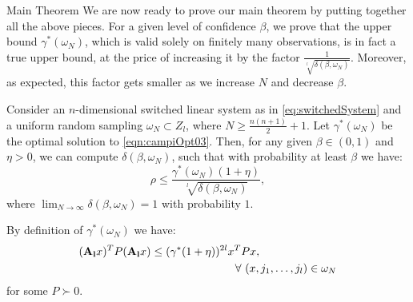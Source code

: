 \begin{subsection}{Main Theorem}
We are now ready to prove our main theorem by putting together all the above pieces. For a given level of confidence $\beta$, we prove that the upper bound $\gamma^{*}(\omega_N)$, which is valid solely on finitely many observations, is in fact a true upper bound, at the price of increasing it by the factor $\frac{1}{\sqrt[l]{\delta(\beta, \omega_N)}}$. Moreover, as expected, this factor gets smaller as we increase $N$ and decrease $\beta$.


\begin{thm}\label{thm:mainTheorem}
Consider an $n$-dimensional switched linear system as in \eqref{eq:switchedSystem} and a uniform random sampling $\omega_N \subset Z_l$, where $N \geq \frac{n(n+1)}{2}+1$. Let $\gamma^{*}(\omega_N) $ be the optimal solution to \eqref{eqn:campiOpt03}. Then, for any given $\beta \in (0,1)$ and $\eta > 0$, we can compute $\delta(\beta, \omega_N)$, such that with probability at least $\beta$ we have:
$$\rho \leq \frac{\gamma^{*}(\omega_N) (1+ \eta)}{\sqrt[l]{\delta(\beta, \omega_N)}},$$
where $\lim_{N \to \infty}\delta(\beta, \omega_N) = 1$ with probability $1$.
\end{thm}


\begin{pf}

By definition of $\gamma^{*}(\omega_N)$ we have:
\begin{equation*}
\begin{aligned} 
&(\mathbf{A_l} x)^T P (\mathbf{A_l} x) \leq (\gamma^{*}(1+\eta))^{2l} x^T P x, \\
& \qquad \qquad \qquad \qquad \qquad \qquad \qquad \forall\ (x, j_1, \dots, j_l)  \in \omega_N 
\end{aligned}
\end{equation*}
for some $P \succ 0$. 


\end{pf}
\end{subsection}
